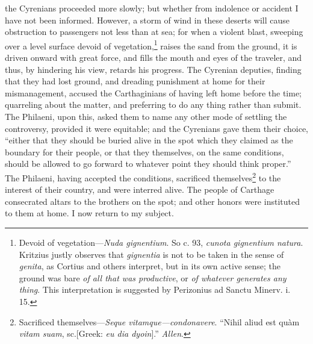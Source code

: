 the Cyrenians proceeded more slowly; but whether from indolence or
accident I have not been informed. However, a storm of wind in these
deserts will cause obstruction to passengers not less than at sea; for
when a violent blast, sweeping over a level surface devoid of
vegetation,\footnote{Devoid of vegetation—\emph{Nuda gignentium}. So c. 93, \emph{cunota
gignentium natura}. Kritzius justly observes that \emph{gignentia} is not
to be taken in the sense of \emph{genita}, as Cortius and others interpret,
but in its own active sense; the ground was bare \emph{of all that was
productive}, or \emph{of whatever generates any thing}. This interpretation
is suggested by Perizonius ad Sanctu Minerv. i. 15.} raises the sand from the ground, it is driven onward
with great force, and fills the mouth and eyes of the traveler, and
thus, by hindering his view, retards his progress. The Cyrenian
deputies, finding that they had lost ground, and dreading punishment
at home for their mismanagement, accused the Carthaginians of having
left home before the time; quarreling about the matter, and preferring
to do any thing rather than submit. The Philaeni, upon this, asked
them to name any other mode of settling the controversy, provided it
were equitable; and the Cyrenians gave them their choice, ``either that
they should be buried alive in the spot which they claimed as the
boundary for their people, or that they themselves, on the same
conditions, should be allowed to go forward to whatever point they
should think proper.'' The Philaeni, having accepted the conditions,
sacrificed themselves\footnote{Sacrificed themselves—\emph{Seque vitamque—condonavere}.
``Nihil aliud est quàm \emph{vitam suam}, sc.[Greek: \emph{eu dia dyoin}].''
\emph{Allen}.} to the interest of their country, and were
interred alive. The people of Carthage consecrated altars to the
brothers on the spot; and other honors were instituted to them at
home. I now return to my subject.


